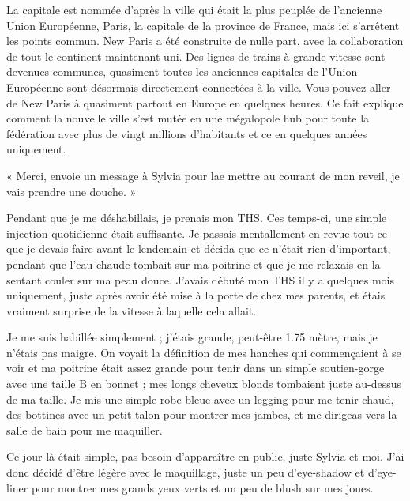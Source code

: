 \documentclass[12pt,hidelinks,a4paper]{book}
\begin{document}
La capitale est nommée d'après la ville qui était la plus peuplée
de l'ancienne Union Européenne, Paris, la capitale de la province
de France, mais ici s'arrêtent les points commun. New Paris a été
construite de nulle part, avec la collaboration de tout le continent
maintenant uni. Des lignes de trains à grande vitesse sont devenues
communes, quasiment toutes les anciennes capitales de l'Union Européenne
sont désormais directement connectées à la ville. Vous pouvez aller
de New Paris à quasiment partout en Europe en quelques heures. Ce
fait explique comment la nouvelle ville s'est mutée en une mégalopole
hub pour toute la fédération avec plus de vingt millions d'habitants
et ce en quelques années uniquement.\par

\bigskip

« Merci, envoie un message à Sylvia pour lae mettre au courant de
mon reveil, je vais prendre une douche. »\par

\bigskip
Pendant que je me déshabillais, je prenais mon THS. Ces temps-ci,
une simple injection quotidienne était suffisante. Je passais mentallement
en revue tout ce que je devais faire avant le lendemain et décida
que ce n'était rien d'important, pendant que l'eau chaude tombait
sur ma poitrine et que je me relaxais en la sentant couler sur ma
peau douce. J'avais débuté mon THS il y a quelques mois uniquement,
juste après avoir été mise à la porte de chez mes parents, et étais
vraiment surprise de la vitesse à laquelle cela allait.\par 

\bigskip

Je me suis habillée simplement ; j'étais grande, peut-être 1.75 mètre,
mais je n'étais pas maigre. On voyait la définition de mes hanches
qui commençaient à se voir et ma poitrine était assez grande pour
tenir dans un simple soutien-gorge avec une taille B en bonnet ; mes
longs cheveux blonds tombaient juste au-dessus de ma taille. Je mis
une simple robe bleue avec un legging pour me tenir chaud, des bottines
avec un petit talon pour montrer mes jambes, et me dirigeas vers la
salle de bain pour me maquiller.\par

\bigskip

Ce jour-là était simple, pas besoin d'apparaître en public, juste
Sylvia et moi. J'ai donc décidé d'être légère avec le maquillage,
juste un peu d'eye-shadow et d'eye-liner pour montrer mes grands yeux
verts et un peu de blush sur mes joues.\par
\end{document}
